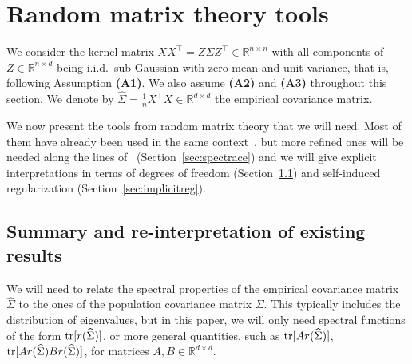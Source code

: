 \documentclass[11pt]{article}
\newcommand{\tr}{\mathop{ \rm tr}}
\newcommand{\rb}{\mathbb{R}}
\newcommand{\mysec}[1]{Section~\ref{sec:#1}}
\def \hS{ \widehat{ \Sigma} }
\def \S{  { \Sigma} }
\begin{document}
\section{Random matrix theory tools}
\label{sec:rmt}


We consider the kernel matrix $XX^\top = Z \S Z^\top \in \rb^{n \times n}$ with all components of $Z \in \rb^{n \times d}$ being i.i.d.~sub-Gaussian with zero mean and unit variance, that is, following Assumption \textbf{(A1)}. We also assume  \textbf{(A2)} and  \textbf{(A3)} throughout this section. We denote by $\hS = \frac{1}{n}X^\top X \in \rb^{d \times d}$ the empirical covariance matrix.

We now present the tools from random matrix theory that we will need. Most of them have already been used in the same context~\cite{dobriban2018high,hastie2019surprises,richards2021asymptotics,lejeune2022asymptotics}, but more refined ones will be needed along the lines of~\cite{dar2021common,lejeune2022asymptotics} (\mysec{spectrace}) and we will give explicit interpretations in terms of degrees of freedom (\mysec{rmt_inter}) and self-induced regularization (\mysec{implicitreg}).


\subsection{Summary and re-interpretation of existing results} 
\label{sec:rmt_inter}

We will need to relate the spectral properties of the empirical covariance matrix $\hS$ to the ones of the population covariance matrix $\S$. This typically includes the distribution of eigenvalues, but in this paper, we will only need spectral functions of the form $\tr [ r(\hS)]$, or more general quantities, such as $\tr [A r(\hS)]$, $\tr [ Ar(\hS) Br(\hS)]$, for matrices $A,B \in \rb^{d \times d}$.
\end{document}

